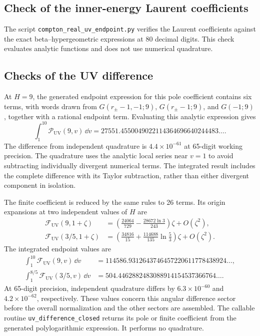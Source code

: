 \subsection{Check of the inner-energy Laurent coefficients}
The script \nolinkurl{compton_real_uv_endpoint.py} verifies the
Laurent coefficients against the exact beta--hypergeometric
expressions at 80 decimal digits. This check evaluates analytic
functions and does not use numerical quadrature.

\subsection{Checks of the UV difference}
At $H=9$, the generated endpoint expression for this pole coefficient
contains six terms, with words drawn from
$G(r_\pm-1,-1;9)$, $G(r_\pm-1;9)$, and $G(-1;9)$, together with a
rational endpoint term. Evaluating this analytic expression gives
\begin{equation}
 \int_1^{10}\mathcal P_{\mathrm{UV}}(9,v)\,\dd v
 =27551.4550049022114364696640244483\ldots.
\end{equation}
The difference from independent quadrature is $4.4\times10^{-61}$ at
65-digit working precision. The quadrature uses the analytic local series
near $v=1$ to avoid subtracting individually divergent numerical terms.
The integrated result includes the complete difference with its Taylor
subtraction, rather than either divergent component in isolation.

The finite coefficient is reduced by the same rules to 26 terms.
Its origin expansions at two independent values of $H$ are
\begin{align}
 \mathcal F_{\mathrm{UV}}(9,1+\zeta)
 &=\left(\frac{24064}{729}-\frac{28672\ln3}{243}\right)\zeta+O(\zeta^2),\\
 \mathcal F_{\mathrm{UV}}(3/5,1+\zeta)
 &=\left(\frac{34816}{15}+\frac{114688}{135}\ln\frac53\right)\zeta+O(\zeta^2).
\end{align}
The integrated endpoint values are
\begin{align}
 \int_1^{10}\mathcal F_{\mathrm{UV}}(9,v)\,\dd v
 &=114586.9312643746457220611778438924\ldots,\\
 \int_1^{8/5}\mathcal F_{\mathrm{UV}}(3/5,v)\,\dd v
 &=504.4462882483088914154537366764\ldots.
\end{align}
At 65-digit precision, independent quadrature differs by
$6.3\times10^{-60}$ and $4.2\times10^{-62}$, respectively.
These values concern this angular difference sector before the overall
normalization and the other sectors are assembled.
The callable routine \texttt{uv\_difference\_closed} returns its pole or
finite coefficient from the generated polylogarithmic expression.
It performs no quadrature.

